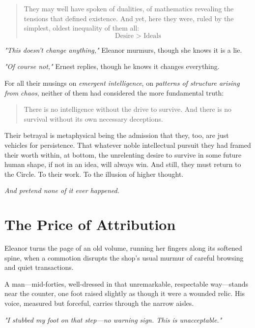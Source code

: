 \begin{quote}
They may well have spoken of dualities, of mathematics revealing the tensions that defined existence.  And yet, here they were, ruled by the simplest, oldest inequality of them all:  
\[
\text{Desire > Ideals}
\]
\end{quote}

\smallskip

\textit{"This doesn’t change anything,"} Eleanor murmurs, though she knows it is a lie.

\textit{"Of course not,"} Ernest replies, though he knows it changes everything.

\smallskip

For all their musings on \textit{emergent intelligence}, on \textit{patterns of structure arising from chaos}, neither of them had considered the more fundamental truth:

\begin{quote}
There is no intelligence without the drive to survive.  And there is no survival without its own necessary deceptions.  
\end{quote}

Their betrayal is metaphysical being the admission that they, too, are just vehicles for persistence. That whatever noble intellectual pursuit they had framed their worth within, at bottom, the unrelenting desire to survive in some future human shape, if not in an idea, will always win. And still, they must return to the Circle. To their work. To the illusion of higher thought.

\textit{And pretend none of it ever happened.}

\newpage

\section*{The Price of Attribution}

Eleanor turns the page of an old volume, running her fingers along its softened spine, when a commotion disrupts the shop’s usual murmur of careful browsing and quiet transactions. 

A man—mid-forties, well-dressed in that unremarkable, respectable way—stands near the counter, one foot raised slightly as though it were a wounded relic. His voice, measured but forceful, carries through the narrow aisles.

\smallskip

\textit{"I stubbed my foot on that step—no warning sign. This is unacceptable."}

